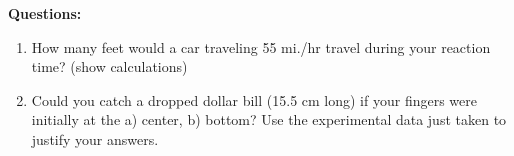 \medskip

{\noindent \bf Questions:}

\begin{enumerate}
\item How many feet would a car traveling 55 mi./hr travel during your reaction time?
(show calculations) \vspace{10mm}

\item Could you catch a dropped dollar bill (15.5 cm long) if your fingers were initially
at the a) center, b) bottom? Use the experimental data just taken to justify
your answers.
\end{enumerate}
